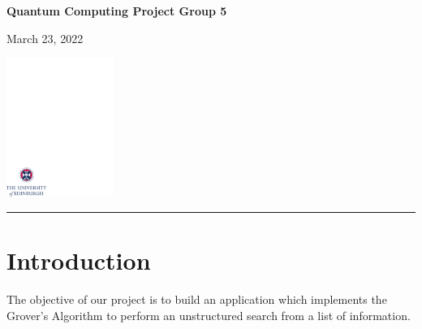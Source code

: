 \documentclass{article}
\begin{document}
\onehalfspacing
\parindent=0pt          %


\thispagestyle{empty}

\vspace*{0.1\textheight}

\begin{center}
        \huge{\bfseries Quantum Computing Project Group 5}\\
\end{center}

\bigskip

\begin{center}
        \large{March 23, 2022}
\end{center}

\vspace*{0.4\textheight}

\begin{center}
        \includegraphics[width=35mm]{crest.pdf}
\end{center}

\medskip

\newpage

\vspace{10mm}
\hrule

\vspace{10mm}

\section*{Introduction} %
\vspace{10mm}

The objective of our project is to build an application which implements the Grover's Algorithm to perform an unstructured search from a list of information.
\vspace{5mm}
\end{document}
